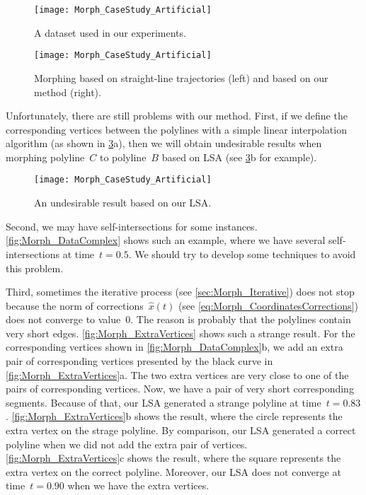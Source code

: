 \begin{figure}[tb]
	\centering	
	\texttt{[image: Morph\_CaseStudy\_Artificial]}
	\caption{A dataset used in our experiments.}
	\label{fig:Morph_Data}
\end{figure}


\begin{figure}[tb]
	\centering	
	\texttt{[image: Morph\_CaseStudy\_Artificial]}
	\caption{Morphing based on 
		straight-line trajectories (left) and
		based on our method (right).}
	\label{fig:Morph_Comparison}
\end{figure}

Unfortunately, there are still problems with our method. 
First, if we define the corresponding vertices 
between the polylines 
with a simple linear interpolation algorithm
(as shown in \fig\ref{fig:Morph_Undesirable}a), 
then we will obtain undesirable results 
when morphing polyline~$C$ to polyline~$B$ 
based on LSA 
(see \fig\ref{fig:Morph_Undesirable}b for example).

\begin{figure}[tb]
	\centering	
	\texttt{[image: Morph\_CaseStudy\_Artificial]}
	\caption{An undesirable result based on our LSA.}
	\label{fig:Morph_Undesirable}
\end{figure}

Second, we may have self-intersections for some instances.
\fig\ref{fig:Morph_DataComplex} shows such an example,
where we have several self-intersections at time~$t=0.5$.  
We should try to develop some techniques 
to avoid this problem.

Third, sometimes the iterative process
(see \sect\ref{sec:Morph_Iterative})
does not stop because the norm of corrections~$\hat{x}(t)$
(see \eq\ref{eq:Morph_CoordinatesCorrections})
does not converge to value~$0$.
The reason is probably that
the polylines contain very short edges. 
\fig\ref{fig:Morph_ExtraVertices} shows such a strange result. 
For the corresponding vertices shown in 
\fig\ref{fig:Morph_DataComplex}b, 
we add an extra pair of corresponding vertices 
presented by the black curve in 
\fig\ref{fig:Morph_ExtraVertices}a.
The two extra vertices are very close to 
one of the pairs of corresponding vertices. 
Now, we have a pair of very short corresponding segments.
Because of that, our LSA generated a strange polyline 
at time~$t = 0.83$.
\fig\ref{fig:Morph_ExtraVertices}b shows the result, 
where the circle represents the extra vertex 
on the strage polyline.
By comparison, our LSA generated a correct polyline 
when we did not add the extra pair of vertices.
\fig\ref{fig:Morph_ExtraVertices}c shows the result, 
where the square represents the extra vertex 
on the correct polyline.
Moreover, our LSA does not converge 
at time~$t = 0.90$ when we have the extra vertices.

